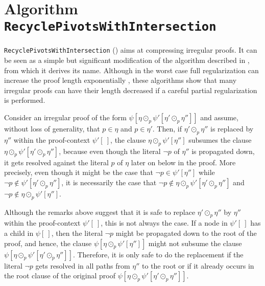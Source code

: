 \section{Algorithm \texttt{RecyclePivotsWithIntersection}}
\label{Section:RPI}

\newcommand{\tRes}{\odot}
\newcommand{\tResFact}{\otimes}
\newcommand{\tResChain}{\ominus}
\newcommand{\AXC}{\AxiomC}
\newcommand{\BIC}{\BinaryInfC}
\newcommand{\RName}[1]{\RightLabel{#1}}
\newcommand{\p}[1]{\hat{#1}}
\newcommand{\ub}[2]{\underbrace{#1}_{#2}}
\newcommand{\tResStar}{\circledast}

\texttt{RecyclePivotsWithIntersection} ({\RPI}) \cite{LURPI} aims at compressing irregular proofs. It can be seen as a simple 
but significant modification of the {\RP} algorithm described in 
\cite{RP08}, 
from which it derives its name. 
Although in the worst case full regularization can increase the proof length exponentially 
\cite{Tseitin}, these algorithms show that 
many irregular proofs can have their length decreased if a careful partial regularization is performed. 

Consider an irregular proof of the form $\psi[ \eta \tRes_p \psi'[\eta' \tRes_p \eta''] ]$ and assume, without loss of generality, that $p \in \eta$ and $p \in \eta'$. Then, if $\eta' \tRes_p \eta''$ is replaced by $\eta''$ within the proof-context $\psi'[\ ]$, the clause $\eta \tRes_p \psi'[\eta'']$ subsumes the clause $\eta \tRes_p \psi'[\eta' \tRes_p \eta'']$, because even though the literal $\neg p$ of $\eta''$ is
propagated down, it gets resolved against the literal $p$ of $\eta$ later on below in the proof. More precisely, even though it might be the case that $\neg p \in \psi'[\eta'']$ while $\neg p \notin \psi'[\eta' \tRes_p \eta'']$, it is necessarily the case that $\neg p \notin \eta \tRes_p \psi'[\eta' \tRes_p \eta'']$ and $\neg p \notin \eta \tRes_p \psi'[\eta'']$.

Although the remarks above suggest that it is safe to replace $\eta' \tRes_p
\eta''$ by $\eta''$ within the proof-context $\psi'[\ ]$, this is not always the
case. If a node in $\psi'[\ ]$ has a child in $\psi[\ ]$, then the literal $\neg
p$ might be propagated down to the root of the proof, and hence, the clause
$\psi[ \eta \tRes_p \psi'[ \eta''] ]$ might not subsume the clause $\psi[ \eta
\tRes_p \psi'[\eta' \tRes_p \eta''] ]$. Therefore, it is only safe to do the
replacement if the literal $\neg p$ gets resolved in all paths from $\eta''$ to the root or if it already occurs in the root clause of the original proof $\psi[ \eta \tRes_p \psi'[\eta' \tRes_p \eta''] ]$.



